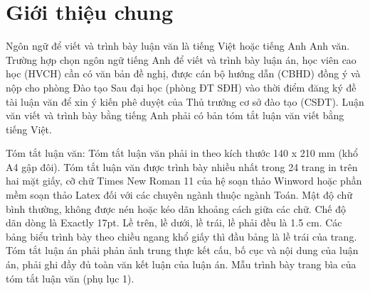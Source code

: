 \chapter{Giới thiệu chung}
\label{Chapter1}

Ngôn ngữ để viết và trình bày luận văn là tiếng Việt hoặc tiếng Anh Anh văn. 
Trường hợp chọn ngôn ngữ tiếng Anh để viết và trình bày luận án, học viên cao học (HVCH) cần có văn bản đề nghị, được cán bộ hướng dẫn (CBHD) đồng ý và nộp cho phòng Đào tạo Sau đại học (phòng ĐT SĐH) vào thời điểm đăng ký đề tài luận văn để xin ý kiến phê duyệt của Thủ trưởng cơ sở đào tạo (CSĐT).
Luận văn viết và trình bày bằng tiếng Anh phải có bản tóm tắt luận văn viết bằng tiếng Việt.

Tóm tắt luận văn: Tóm tắt luận văn phải in theo kích thước 140 x 210 mm (khổ A4 gập đôi).
Tóm tắt luận văn được trình bày nhiều nhất trong 24 trang in trên hai mặt giấy, cỡ chữ Times New Roman 11 của hệ soạn thảo Winword hoặc phần mềm soạn thảo Latex đối với các chuyên ngành thuộc ngành Toán.
Mật độ chữ bình thường, không được nén hoặc kéo dãn khoảng cách giữa các chữ.
Chế độ dãn dòng là Exactly 17pt.
Lề trên, lề dưới, lề trái, lề phải đều là 1.5 cm.
Các bảng biểu trình bày theo chiều ngang khổ giấy thì đầu bảng là lề trái của trang.
Tóm tắt luận án phải phản ảnh trung thực kết cấu, bố cục và nội dung của luận án, phải ghi đầy đủ toàn văn kết luận của luận án.
Mẫu trình bày trang bìa của tóm tắt luận văn (phụ lục 1).